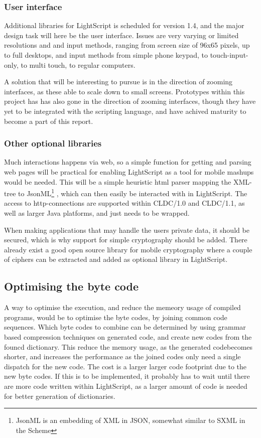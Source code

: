 \documentclass[11pt]{report}
\begin{document}
\subsubsection{User interface}
Additional libraries for LightScript is scheduled for version 1.4, and the major design task will here be the user interface. 
Issues are very varying or limited resolutions and and input methods, ranging from screen size of 96x65 pixels, up to full desktops, and input methods from simple phone keypad, to touch-input-only, to multi touch, to regular computers.

A solution that will be interesting to pursue is in the direction of zooming interfaces, as these able to scale down to small screens.
Prototypes within this project has has also gone in the direction of zooming interfaces, though they have yet to be integrated with the scripting language, and have achived maturity to become a part of this report.

\subsubsection{Other optional libraries}

Much interactions happens via web, so a simple function for getting and parsing web pages will be practical for enabling LightScript as a tool for mobile mashups would be needed. This will be a simple heuristic html parser mapping the XML-tree to JsonML\footnote{JsonML is an embedding of XML in JSON, somewhat similar to SXML in the Scheme} \cite{jsonml}, which can then easily be interacted with in LightScript.
The access to http-connections are supported within CLDC/1.0 and CLDC/1.1, as well as larger Java platforms, and just needs to be wrapped.

When making applications that may handle the users private data, it should be secured, which is why support for simple cryptography should be added. There already exist a good open source library for mobile cryptography \cite{bouncycastle} where a couple of ciphers can be extracted and added as optional library in LightScript.

\subsection{Optimising the byte code}

A way to optimise the execution, and reduce the memeory usage of compiled programs, would be to optimise the byte codes, by joining common code sequences. Which byte codes to combine can be determined by using grammar based compression techniques on generated code, and create new codes from the founcd dictionary. 
This reduce the memory usage, as the generated codebecomes shorter, and increases the performance as the joined codes only need a single dispatch for the new code. The cost is a larger larger code footprint due to the new byte codes. If this is to be implemented, it probably has to wait until there are more code written within LightScript, as a larger amount of code is needed for better generation of dictionaries.
\end{document}
